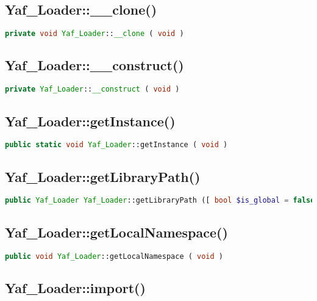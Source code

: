 \subsection{Yaf\_Loader::\_\_clone()}



\begin{lstlisting}[language=PHP]
private void Yaf_Loader::__clone ( void )
\end{lstlisting}

\subsection{Yaf\_Loader::\_\_construct()}

\begin{lstlisting}[language=PHP]
private Yaf_Loader::__construct ( void )
\end{lstlisting}

\subsection{Yaf\_Loader::getInstance()}

\begin{lstlisting}[language=PHP]
public static void Yaf_Loader::getInstance ( void )
\end{lstlisting}


\subsection{Yaf\_Loader::getLibraryPath()}

\begin{lstlisting}[language=PHP]
public Yaf_Loader Yaf_Loader::getLibraryPath ([ bool $is_global = false ] )
\end{lstlisting}


\subsection{Yaf\_Loader::getLocalNamespace()}

\begin{lstlisting}[language=PHP]
public void Yaf_Loader::getLocalNamespace ( void )
\end{lstlisting}


\subsection{Yaf\_Loader::import()}

